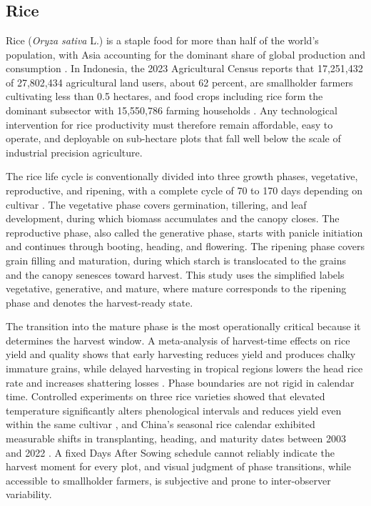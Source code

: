 \chapter{\babDua}


\section{Rice}
\label{sec:rice}

Rice (\textit{Oryza sativa} L.) is a staple food for more than half of the world's population, with Asia accounting for the dominant share of global production and consumption \cite{mohidem2022rice}. In Indonesia, the 2023 Agricultural Census reports that 17{,}251{,}432 of 27{,}802{,}434 agricultural land users, about 62 percent, are smallholder farmers cultivating less than 0.5 hectares, and food crops including rice form the dominant subsector with 15{,}550{,}786 farming households \cite{bps2023sensus}. Any technological intervention for rice productivity must therefore remain affordable, easy to operate, and deployable on sub-hectare plots that fall well below the scale of industrial precision agriculture.

The rice life cycle is conventionally divided into three growth phases, vegetative, reproductive, and ripening, with a complete cycle of 70 to 170 days depending on cultivar \cite{mohapatra2025staging}. The vegetative phase covers germination, tillering, and leaf development, during which biomass accumulates and the canopy closes. The reproductive phase, also called the generative phase, starts with panicle initiation and continues through booting, heading, and flowering. The ripening phase covers grain filling and maturation, during which starch is translocated to the grains and the canopy senesces toward harvest. This study uses the simplified labels vegetative, generative, and mature, where mature corresponds to the ripening phase and denotes the harvest-ready state.

The transition into the mature phase is the most operationally critical because it determines the harvest window. A meta-analysis of harvest-time effects on rice yield and quality shows that early harvesting reduces yield and produces chalky immature grains, while delayed harvesting in tropical regions lowers the head rice rate and increases shattering losses \cite{zhou2025metaharvest}. Phase boundaries are not rigid in calendar time. Controlled experiments on three rice varieties showed that elevated temperature significantly alters phenological intervals and reduces yield even within the same cultivar \cite{sanwong2023ricetemp}, and China's seasonal rice calendar exhibited measurable shifts in transplanting, heading, and maturity dates between 2003 and 2022 \cite{li2024chinaricecalendar}. A fixed Days After Sowing schedule cannot reliably indicate the harvest moment for every plot, and visual judgment of phase transitions, while accessible to smallholder farmers, is subjective and prone to inter-observer variability.

